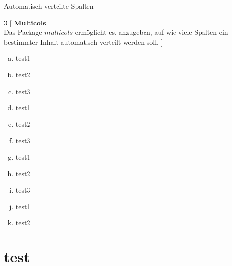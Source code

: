 \documentclass[ngerman,14pt,aspectratio=1610]{beamer}
\def\secname{Gliederung}
\newcommand{\mysection}[1]{
	\section{#1}
	\newtotcounter{#1}
	\def\secname{#1}
	}
\begin{document}
	\begin{frame}{Automatisch verteilte Spalten}
		\begin{multicols*}{3}
			[
			\textbf{Multicols} \\
			Das Package $multicols$ ermöglicht es, anzugeben, auf wie viele Spalten ein bestimmter Inhalt automatisch verteilt werden soll.
			]
			\begin{enumerate}[a)]
				\item test1
				\item test2
				\item test3
				\item test1
				\item test2
				\item test3
				\item test1
				\item test2
				\item test3
				\item test1
				\item test2
			\end{enumerate}
		\end{multicols*}
	\end{frame}
	
	\mysection{test}
\end{document}

